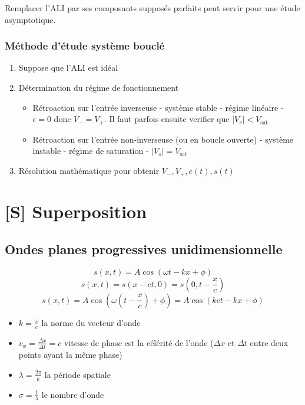 \documentclass[openany]{book}
\begin{document}
\noindent Remplacer l'ALI par ses composants supposés parfaits peut servir pour une étude asymptotique. 

\subsection{Méthode d'étude système bouclé}
\begin{enumerate}
    \item Suppose que l'ALI est idéal
    \item Détermination du régime de fonctionnement
        \begin{itemize}
            \item Rétroaction sur l'entrée inverseuse - système stable - régime linéaire - $\epsilon = 0$ donc $V_-=V_+$. Il faut parfois ensuite verifier que $|V_s| < V_{\text{sat}}$
            \item Rétroaction sur l'entrée non-inverseuse (ou en boucle ouverte) - système instable - régime de saturation - $ |V_s| = V_{\text{sat}} $
        \end{itemize}
    \item Résolution mathématique pour obtenir $V_-, V_+, e(t), s(t)$
\end{enumerate}

\clearpage
\chapter{[S] Superposition}

\section{Ondes planes progressives unidimensionnelle}

\[ s(x, t) = A\cos{(\omega t - k x + \phi)} \]
\[ s(x, t) = s(x-ct, 0) = s(0, t-\frac{x}{c}) \]
\[ s(x, t) = A\cos{(\omega(t-\frac{x}{c}) + \phi)} = A\cos{(kct- kx  + \phi)} \]

\begin{itemize}
    \item $ k = \frac{\omega}{c} $ la norme du vecteur d'onde 
    \item $ v_{\phi} = \frac{\Delta x}{\Delta t} = c $ vitesse de phase est la célérité de l'onde ($\Delta x$ et $\Delta t$ entre deux points ayant la même phase)
    \item $ \lambda = \frac{2 \pi}{k} $ la période spatiale
    \item $ \sigma = \frac{1}{\lambda} $ le nombre d'onde
\end{itemize}
\end{document}
